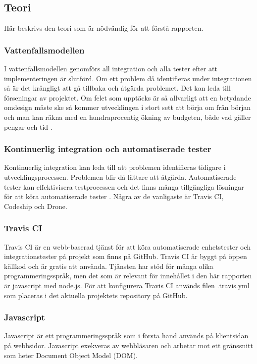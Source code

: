 \subsection{Teori}
Här beskrivs den teori som är nödvändig för att förstå rapporten.

\subsubsection{Vattenfallsmodellen}
I vattenfallsmodellen genomförs all integration och alla tester efter att implementeringen är slutförd. 
Om ett problem då identifieras under integrationen så är det krångligt att gå 
tillbaka och åtgärda problemet. 
Det kan leda till förseningar av projektet.
Om felet som upptäcks är så allvarligt att en betydande omdesign måste ske så
kommer utvecklingen i stort sett att börja om från början och man kan räkna 
med en hundraprocentig ökning av budgeten, 
både vad gäller pengar och tid \cite{Royce}.

\subsubsection{Kontinuerlig integration och automatiserade tester}
Kontinuerlig integration kan leda till att problemen identifieras tidigare i 
utvecklingsprocessen. Problemen blir då lättare att åtgärda. Automatiserade tester kan effektivisera 
testprocessen och det finns många tillgängliga lösningar för att köra automatiserade
tester \cite{Karlsson}.
Några av de vanligaste är Travis CI, Codeship och Drone.

\subsubsection{Travis CI}
Travis CI är en webb-baserad tjänst för att köra automatiserade enhetstester och integrationstester
på projekt som finns på GitHub. Travis CI är byggt på öppen källkod och är gratis att använda. 
Tjänsten har stöd för många olika programmeringsspråk, men det som är 
relevant för innehållet i den här rapporten
är javascript med node.js. För att konfigurera Travis CI används filen .travis.yml 
som placeras i det aktuella
projektets repository på GitHub.

\subsubsection{Javascript}
Javascript är ett programmeringsspråk som i första hand används på klientsidan på webbsidor.
Javascript exekveras av webbläsaren och arbetar mot ett gränssnitt som heter 
Document Object Model (DOM).


